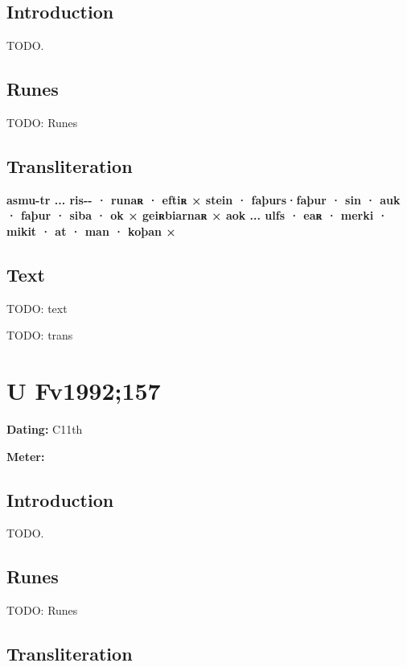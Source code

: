 \subsection{Introduction}

TODO.

\subsection{Runes}

TODO: Runes%

\subsection{Transliteration}

\textbf{asmu-tr ... ris-{}- · runaʀ · eftiʀ × stein · faþurs·faþur · sin · auk · faþur · siba · ok × geiʀbiarnaʀ × aok ... ulfs · eaʀ · merki · mikit · at · man · koþan ×}

\subsection{Text}

\bpg\bpa[0]%
TODO: text\epa

\bpb TODO: trans\epb\epg

\sectionline\clearpage


\section{U Fv1992;157}

\begin{flushright}%
\textbf{Dating:} C11th

\textbf{Meter:} \Fornyrdislag
\end{flushright}%

\subsection{Introduction}

TODO.

\subsection{Runes}

TODO: Runes%

\subsection{Transliteration}

